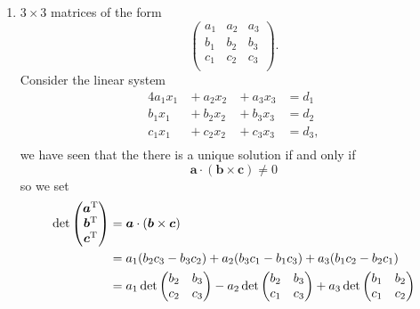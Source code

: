\begin{enumerate}
    \item $3\times 3$ matrices of the form
    \[
        \begin{pmatrix}
            a_1&a_2&a_3\\
            b_1&b_2&b_3\\
            c_1&c_2&c_3\\
        \end{pmatrix}
        .
    \]
    Consider the linear system
    \begin{alignat*}{4}
        a_1x_1&{}+{}a_2x_2&{}+{}a_3x_3&{}={}d_1\\
        b_1x_1&{}+{}b_2x_2&{}+{}b_3x_3&{}={}d_2\\
        c_1x_1&{}+{}c_2x_2&{}+{}c_3x_3&{}={}d_3,\\
    \end{alignat*}
    we have seen that the there is a unique solution if and only if \[\bm a\cdot(\bm b\times\bm c)\neq 0\] so we set
    \begin{align*}
        \det{
            \begin{pmatrix}
                \bm a^{\rm T}\\
                \bm b^{\rm T}\\
                \bm c^{\rm T}\\
            \end{pmatrix}
        }
        &=\bm a\cdot(\bm b\times\bm c)\\
        &=a_1(b_2c_3-b_3c_2)+a_2(b_3c_1-b_1c_3)+a_3(b_1c_2-b_2c_1)\\
        &=a_1\det{
            \begin{pmatrix}
                b_2&b_3\\
                c_2&c_3\\
            \end{pmatrix}
        }
        -a_2\det{
            \begin{pmatrix}
                b_2&b_3\\
                c_1&c_3\\
            \end{pmatrix}
        }
        +a_3\det{
            \begin{pmatrix}
                b_1&b_2\\
                c_1&c_2\\
            \end{pmatrix}
        }
        \\
    \end{align*}
\end{enumerate}

